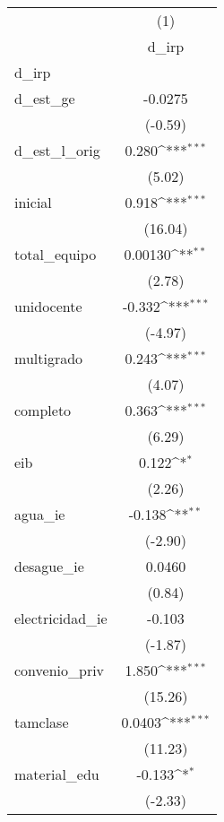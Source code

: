 {
\def\sym#1{\ifmmode^{#1}\else\(^{#1}\)\fi}
\begin{tabular}{l*{1}{c}}
\hline\hline
            &\multicolumn{1}{c}{(1)}\\
            &\multicolumn{1}{c}{d\_irp}\\
\hline
d\_irp       &                     \\
d\_est\_ge    &     -0.0275         \\
            &     (-0.59)         \\
[1em]
d\_est\_l\_orig&       0.280\sym{***}\\
            &      (5.02)         \\
[1em]
inicial     &       0.918\sym{***}\\
            &     (16.04)         \\
[1em]
total\_equipo&     0.00130\sym{**} \\
            &      (2.78)         \\
[1em]
unidocente  &      -0.332\sym{***}\\
            &     (-4.97)         \\
[1em]
multigrado  &       0.243\sym{***}\\
            &      (4.07)         \\
[1em]
completo    &       0.363\sym{***}\\
            &      (6.29)         \\
[1em]
eib         &       0.122\sym{*}  \\
            &      (2.26)         \\
[1em]
agua\_ie     &      -0.138\sym{**} \\
            &     (-2.90)         \\
[1em]
desague\_ie  &      0.0460         \\
            &      (0.84)         \\
[1em]
electricidad\_ie&      -0.103         \\
            &     (-1.87)         \\
[1em]
convenio\_priv&       1.850\sym{***}\\
            &     (15.26)         \\
[1em]
tamclase    &      0.0403\sym{***}\\
            &     (11.23)         \\
[1em]
material\_edu&      -0.133\sym{*}  \\
            &     (-2.33)         \\

\end{tabular}}
